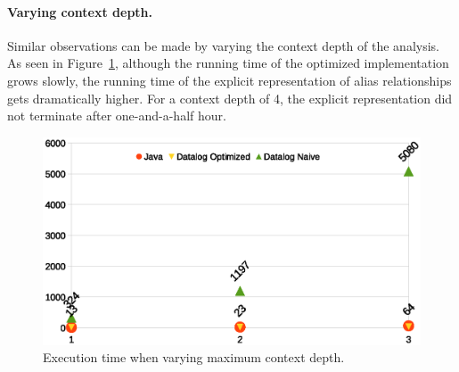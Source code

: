 

\paragraph{Varying context depth.} Similar observations can be made by varying
the context depth of the analysis. As seen in
Figure~\ref{fig:ctxdepth}, although the running time of the optimized
implementation grows slowly, the running time of the explicit
representation of alias relationships gets dramatically higher. For a
context depth of 4, the explicit representation did not terminate
after one-and-a-half hour.

\begin{figure}[h]
  \begin{minipage}[b]{\linewidth}
    \centering
    \includegraphics[clip,width=\linewidth]{assets/must-data/depth.eps}
  \end{minipage}
  \caption{Execution time when varying maximum context depth.}
    \label{fig:ctxdepth}
\end{figure}



